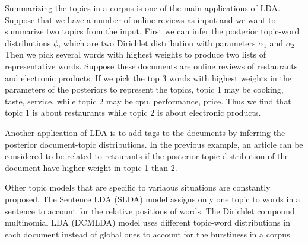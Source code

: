 Summarizing the topics in a corpus is one of the main applications of LDA.
Suppose that we have a number of online reviews as input and we want to
summarize two topics from the input. First we can infer the posterior
topic-word distributions $\phi$, which are two Dirichlet distribution with
parameters $\alpha_1$ and $\alpha_2$. Then we pick several words with highest
weights to produce two lists of representative words. Suppose these documents
are online reviews of restaurants and electronic products. If we pick the top
3 words with highest weights in the parameters of the posteriors to represent
the topics, topic 1 may be cooking, taste, service, while topic 2 may be cpu,
performance, price. Thus we find that topic 1 is about restaurants while topic
2 is about electronic products.

Another application of LDA is to add tags to the documents by inferring the
posterior document-topic distributions. In the previous example, an article
can be considered to be related to retaurants if the posterior topic
distribution of the document have higher weight in topic 1 than 2.

Other topic models that are specific to variaous situations are constantly
proposed. The Sentence LDA (SLDA) model assigns only one topic to words in a
sentence to account for the relative positions of words. The Dirichlet
compound multinomial LDA (DCMLDA) model \cite{Doyle2009} uses different
topic-word distributions in each document instead of global ones to account
for the burstiness in a corpus. 




